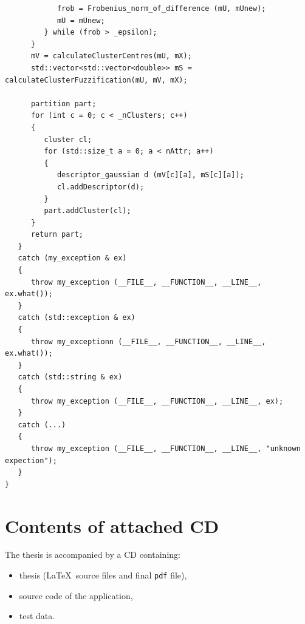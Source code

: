 \documentclass[a4paper,twoside,12pt]{book}
\begin{document}
\begin{appendices}
\begin{lstlisting}
            frob = Frobenius_norm_of_difference (mU, mUnew);
            mU = mUnew;
         } while (frob > _epsilon);
      }
      mV = calculateClusterCentres(mU, mX);
      std::vector<std::vector<double>> mS = calculateClusterFuzzification(mU, mV, mX);
      
      partition part;
      for (int c = 0; c < _nClusters; c++)
      {
         cluster cl; 
         for (std::size_t a = 0; a < nAttr; a++)
         {
            descriptor_gaussian d (mV[c][a], mS[c][a]);
            cl.addDescriptor(d);
         }
         part.addCluster(cl);
      }
      return part;
   }
   catch (my_exception & ex)                                  
   {                                                       
      throw my_exception (__FILE__, __FUNCTION__, __LINE__, ex.what()); 
   }                                                          
   catch (std::exception & ex)                                 
   {                                                            
      throw my_exceptionn (__FILE__, __FUNCTION__, __LINE__, ex.what()); 
   }                                                            
   catch (std::string & ex)                                     
   {                                                            
      throw my_exception (__FILE__, __FUNCTION__, __LINE__, ex);        
   }                                                             
   catch (...)                                                   
   {                                                             
      throw my_exception (__FILE__, __FUNCTION__, __LINE__, "unknown expection");       
   }  
}
\end{lstlisting} 
\fi

\chapter*{Contents of attached CD}

The thesis is accompanied by a CD containing:
\begin{itemize}
\item thesis (\LaTeX\ source files and final \texttt{pdf} file),
\item source code of the application,
\item test data.
\end{itemize}
 

\listoffigures
\listoftables
	
\end{appendices}
\end{document}
